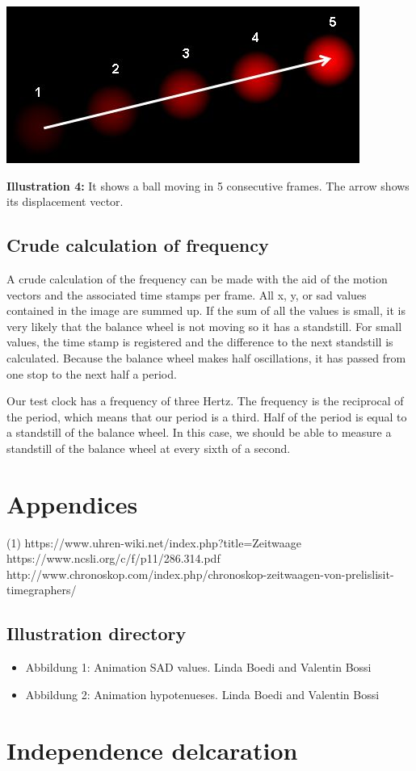 \documentclass[12pt, a4paper]{report}
\begin{document}
\noindent
\begin{center}
\includegraphics[scale=0.55]{Images/optical_flow_basic1.jpg}

{\bf Illustration 4:}  It shows a ball moving in 5 consecutive frames. The arrow shows its displacement vector.
\end{center}

\bigskip
\section{Crude calculation of frequency}
A crude calculation of the frequency can be made with the aid of the motion vectors and the associated time stamps per frame.
All x, y, or sad values contained in the image are summed up. If the sum of all the values is small, it is very likely that the balance wheel is not moving so it has a standstill.
For small values, the time stamp is registered and the difference to the next standstill is calculated.
Because the balance wheel makes half oscillations, it has passed from one stop to the next half a period.

Our test clock has a frequency of three Hertz. The frequency is the reciprocal of the period, which means that our period is a third.
Half of the period is equal to a standstill of the balance wheel. In this case, we should be able to measure a standstill of the balance wheel at every sixth of a second.
\pagebreak

\chapter{Appendices}


\begin{thebibliography}{9}
\bigskip
{} 
(1) https://www.uhren-wiki.net/index.php?title=Zeitwaage
 https://www.ncsli.org/c/f/p11/286.314.pdf
 http://www.chronoskop.com/index.php/chronoskop-zeitwaagen-von-prelislisit-timegraphers/
\end{thebibliography}

\pagebreak

\section {Illustration directory}
\bigskip

\begin{itemize}
\item Abbildung 1: Animation SAD values. Linda Boedi and Valentin Bossi
\item Abbildung 2: Animation hypotenueses. Linda Boedi and Valentin Bossi
\end{itemize}

\chapter{Independence delcaration}
\end{document}
